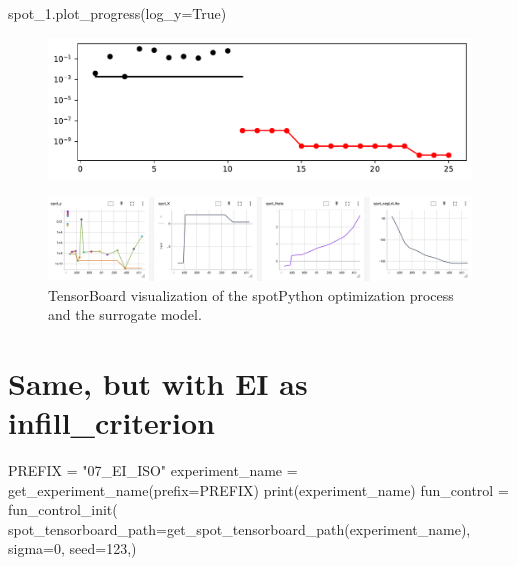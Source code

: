 \documentclass[
  letterpaper,
  DIV=11,
  numbers=noendperiod]{scrreprt}
\newenvironment{Shaded}{\begin{snugshade}}{\end{snugshade}}
\newcommand{\BuiltInTok}[1]{\textcolor[rgb]{0.00,0.23,0.31}{#1}}
\newcommand{\DecValTok}[1]{\textcolor[rgb]{0.68,0.00,0.00}{#1}}
\newcommand{\NormalTok}[1]{\textcolor[rgb]{0.00,0.23,0.31}{#1}}
\newcommand{\OperatorTok}[1]{\textcolor[rgb]{0.37,0.37,0.37}{#1}}
\newcommand{\StringTok}[1]{\textcolor[rgb]{0.13,0.47,0.30}{#1}}
\newcommand{\VariableTok}[1]{\textcolor[rgb]{0.07,0.07,0.07}{#1}}
\begin{document}
\begin{Shaded}
\begin{Highlighting}[]
\NormalTok{spot\_1.plot\_progress(log\_y}\OperatorTok{=}\VariableTok{True}\NormalTok{)}
\end{Highlighting}
\end{Shaded}

\begin{figure}[H]

{\centering \includegraphics{07_spot_ei_files/figure-pdf/cell-8-output-1.pdf}

}

\end{figure}

\begin{figure}

{\centering \includegraphics[width=1\textwidth,height=\textheight]{figures_static/07_tensorboard_Y.png}

}

\caption{TensorBoard visualization of the spotPython optimization
process and the surrogate model.}

\end{figure}

\hypertarget{same-but-with-ei-as-infill_criterion}{%
\section{Same, but with EI as
infill\_criterion}\label{same-but-with-ei-as-infill_criterion}}

\begin{Shaded}
\begin{Highlighting}[]
\NormalTok{PREFIX }\OperatorTok{=} \StringTok{"07\_EI\_ISO"}
\NormalTok{experiment\_name }\OperatorTok{=}\NormalTok{ get\_experiment\_name(prefix}\OperatorTok{=}\NormalTok{PREFIX)}
\BuiltInTok{print}\NormalTok{(experiment\_name)}
\NormalTok{fun\_control }\OperatorTok{=}\NormalTok{ fun\_control\_init(}
\NormalTok{    spot\_tensorboard\_path}\OperatorTok{=}\NormalTok{get\_spot\_tensorboard\_path(experiment\_name),}
\NormalTok{    sigma}\OperatorTok{=}\DecValTok{0}\NormalTok{,}
\NormalTok{    seed}\OperatorTok{=}\DecValTok{123}\NormalTok{,)}
\end{Highlighting}
\end{Shaded}
\end{document}
